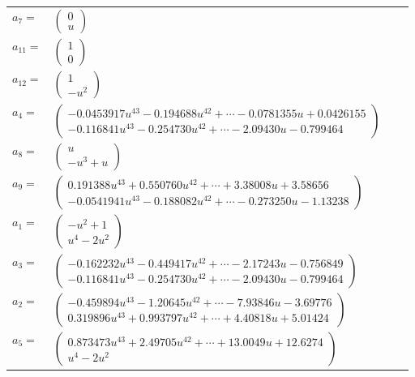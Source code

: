 \documentclass[1p]{elsarticle_modified}
\theoremstyle{definition}
\begin{document}
\begin{tabular}{m{7pt} m{180pt} m{7pt} m{180pt} }
\flushright $a_{7}=$&$\begin{pmatrix}0\\u\end{pmatrix}$ \\
\flushright $a_{11}=$&$\begin{pmatrix}1\\0\end{pmatrix}$ \\
\flushright $a_{12}=$&$\begin{pmatrix}1\\- u^2\end{pmatrix}$ \\
\flushright $a_{4}=$&$\begin{pmatrix}-0.0453917 u^{43}-0.194688 u^{42}+\cdots-0.0781355 u+0.0426155\\-0.116841 u^{43}-0.254730 u^{42}+\cdots-2.09430 u-0.799464\end{pmatrix}$ \\
\flushright $a_{8}=$&$\begin{pmatrix}u\\- u^3+u\end{pmatrix}$ \\
\flushright $a_{9}=$&$\begin{pmatrix}0.191388 u^{43}+0.550760 u^{42}+\cdots+3.38008 u+3.58656\\-0.0541941 u^{43}-0.188082 u^{42}+\cdots-0.273250 u-1.13238\end{pmatrix}$ \\
\flushright $a_{1}=$&$\begin{pmatrix}- u^2+1\\u^4-2 u^2\end{pmatrix}$ \\
\flushright $a_{3}=$&$\begin{pmatrix}-0.162232 u^{43}-0.449417 u^{42}+\cdots-2.17243 u-0.756849\\-0.116841 u^{43}-0.254730 u^{42}+\cdots-2.09430 u-0.799464\end{pmatrix}$ \\
\flushright $a_{2}=$&$\begin{pmatrix}-0.459894 u^{43}-1.20645 u^{42}+\cdots-7.93846 u-3.69776\\0.319896 u^{43}+0.993797 u^{42}+\cdots+4.40818 u+5.01424\end{pmatrix}$ \\
\flushright $a_{5}=$&$\begin{pmatrix}0.873473 u^{43}+2.49705 u^{42}+\cdots+13.0049 u+12.6274\\u^4-2 u^2\end{pmatrix}$ \\

\end{tabular}
\end{document}
